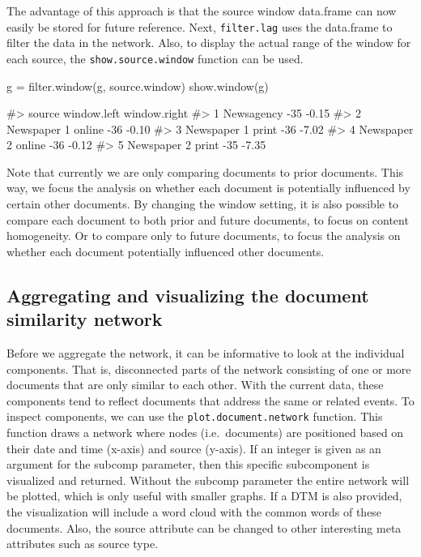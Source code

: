 The advantage of this approach is that the source window data.frame can
now easily be stored for future reference. Next, \texttt{filter.lag}
uses the data.frame to filter the data in the network. Also, to display
the actual range of the window for each source, the
\texttt{show.source.window} function can be used.

\begin{Schunk}
\begin{Sinput}
g = filter.window(g, source.window)
show.window(g)
\end{Sinput}
\begin{Soutput}
#>               source window.left window.right
#> 1         Newsagency         -35        -0.15
#> 2 Newspaper 1 online         -36        -0.10
#> 3  Newspaper 1 print         -36        -7.02
#> 4 Newspaper 2 online         -36        -0.12
#> 5  Newspaper 2 print         -35        -7.35
\end{Soutput}
\end{Schunk}

Note that currently we are only comparing documents to prior documents.
This way, we focus the analysis on whether each document is potentially
influenced by certain other documents. By changing the window setting,
it is also possible to compare each document to both prior and future
documents, to focus on content homogeneity. Or to compare only to future
documents, to focus the analysis on whether each document potentially
influenced other documents.

\subsection{Aggregating and visualizing the document similarity
network}\label{aggregating-and-visualizing-the-document-similarity-network}

Before we aggregate the network, it can be informative to look at the
individual components. That is, disconnected parts of the network
consisting of one or more documents that are only similar to each other.
With the current data, these components tend to reflect documents that
address the same or related events. To inspect components, we can use
the \texttt{plot.document.network} function. This function draws a
network where nodes (i.e.~documents) are positioned based on their date
and time (x-axis) and source (y-axis). If an integer is given as an
argument for the subcomp parameter, then this specific subcomponent is
visualized and returned. Without the subcomp parameter the entire
network will be plotted, which is only useful with smaller graphs. If a
DTM is also provided, the visualization will include a word cloud with
the common words of these documents. Also, the source attribute can be
changed to other interesting meta attributes such as source type.

